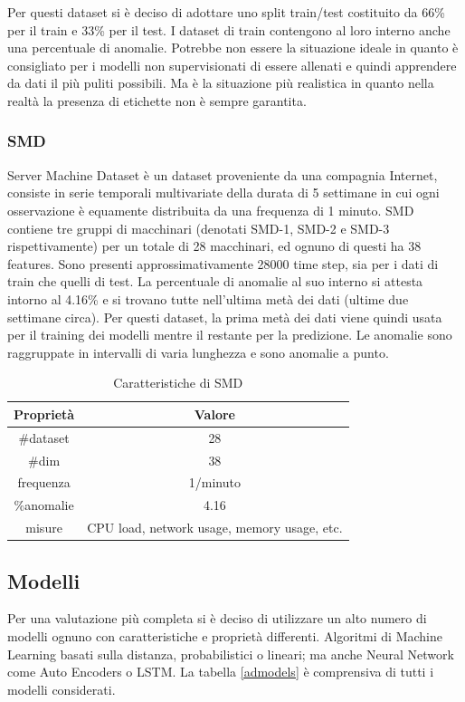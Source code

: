 Per questi dataset si è deciso di adottare uno split train/test costituito da 66\% per il train e 33\% per il test. I dataset di train contengono al loro interno anche una percentuale di anomalie. Potrebbe non essere la situazione ideale in quanto è consigliato per i modelli non supervisionati di essere allenati e quindi apprendere da dati il più puliti possibili. Ma è la situazione più realistica in quanto nella realtà la presenza di etichette non è sempre garantita.  

\subsubsection{SMD}
Server Machine Dataset è un dataset proveniente da una compagnia Internet, consiste in serie temporali multivariate della durata di 5 settimane in cui ogni osservazione è equamente distribuita da una frequenza di 1 minuto. SMD contiene tre gruppi di macchinari (denotati SMD-1, SMD-2 e SMD-3 rispettivamente) per un totale di 28 macchinari, ed ognuno di questi ha 38 features. Sono presenti approssimativamente 28000 time step, sia per i dati di train che quelli di test. 
La percentuale di anomalie al suo interno si attesta intorno al 4.16\% e si trovano tutte nell'ultima metà dei dati (ultime due settimane circa). Per questi dataset, la prima metà dei dati viene quindi usata per il training dei modelli mentre il restante per la predizione.
Le anomalie sono raggruppate in intervalli di varia lunghezza e sono anomalie a punto.
\begin{table}
\centering
\caption{\label{smd}Caratteristiche di SMD}
\begin{tabular}{|c|c|} 
\hline
\textbf{Proprietà} & \textbf{Valore}                              \\ 
\hline
\#dataset     & 28                                           \\ 
\hline
\#dim     & 38                                           \\ 
\hline
frequenza         & 1/minuto                                  
                                   \\ 
\hline
\%anomalie & 4.16                                         \\ 
\hline
misure              & CPU load, network usage, memory usage, etc.  \\
\hline
\end{tabular}
\end{table}


\subsection{Modelli}
Per una valutazione più completa si è deciso di utilizzare un alto numero di modelli ognuno con caratteristiche e proprietà differenti. Algoritmi di Machine Learning basati sulla distanza, probabilistici o lineari; ma anche Neural Network come Auto Encoders o LSTM. La tabella \ref{admodels} è comprensiva di tutti i modelli considerati.

